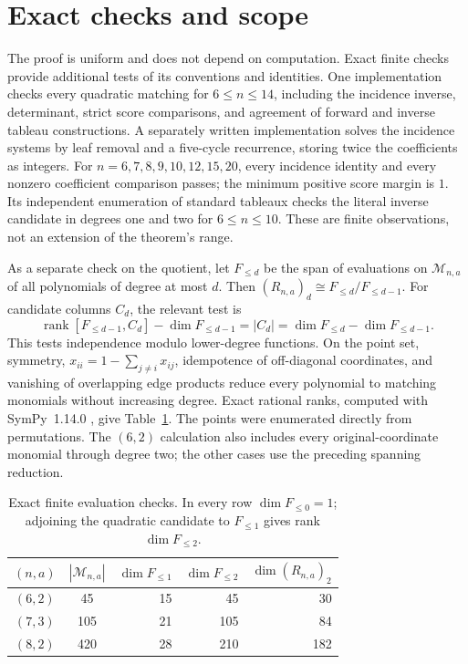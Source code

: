 \documentclass[11pt,a4paper]{article}
\newcommand{\Mn}{\mathcal{M}_{n,a}}
\DeclareMathOperator{\rank}{rank}
\begin{document}
\section{Exact checks and scope}

The proof is uniform and does not depend on computation. Exact finite
checks provide additional tests of its conventions and identities.
One implementation checks every quadratic matching for $6\leq n\leq14$,
including the incidence inverse, determinant, strict score comparisons,
and agreement of forward and inverse tableau constructions.
A separately written implementation solves the incidence systems by leaf
removal and a five-cycle recurrence, storing twice the coefficients as
integers. For $n=6,7,8,9,10,12,15,20$, every incidence identity and every
nonzero coefficient comparison passes; the minimum positive score margin
is $1$. Its independent enumeration of standard tableaux checks the literal
inverse candidate in degrees one and two for $6\leq n\leq10$.
These are finite observations, not an extension of the theorem's range.

As a separate check on the quotient, let $F_{\leq d}$ be the span of
evaluations on $\Mn$ of all polynomials of degree at most $d$.
Then $(R_{n,a})_d\cong F_{\leq d}/F_{\leq d-1}$.
For candidate columns $C_d$, the relevant test is
\[
 \rank[F_{\leq d-1},C_d]-\dim F_{\leq d-1}
 =|C_d|=\dim F_{\leq d}-\dim F_{\leq d-1}.
\]
This tests independence modulo lower-degree functions.
On the point set, symmetry,
$x_{ii}=1-\sum_{j\ne i}x_{ij}$, idempotence of off-diagonal coordinates,
and vanishing of overlapping edge products reduce every polynomial to
matching monomials without increasing degree. Exact rational ranks,
computed with SymPy~1.14.0 \cite{SymPy}, give Table~\ref{tab:ranks}.
The points were enumerated directly from permutations. The $(6,2)$
calculation also includes every original-coordinate monomial through
degree two; the other cases use the preceding spanning reduction.

\begin{table}[htbp]
\centering
\begin{tabular}{ccrrr}
\toprule
$(n,a)$ & $|\Mn|$ & $\dim F_{\leq1}$ & $\dim F_{\leq2}$
 & $\dim(R_{n,a})_2$\\
\midrule
$(6,2)$ & 45  & 15 & 45  & 30\\
$(7,3)$ & 105 & 21 & 105 & 84\\
$(8,2)$ & 420 & 28 & 210 & 182\\
\bottomrule
\end{tabular}
\caption{Exact finite evaluation checks. In every row $\dim F_{\leq0}=1$;
adjoining the quadratic candidate to $F_{\leq1}$ gives rank
$\dim F_{\leq2}$.}\label{tab:ranks}
\end{table}
\end{document}
